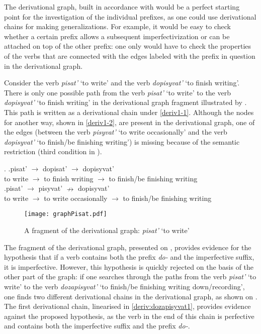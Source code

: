 The derivational graph, built in accordance with  would be a perfect starting point for the investigation of the individual prefixes, as one could use derivational chains for making generalizations. For example, it would be easy to check whether a certain prefix allows a subsequent imperfectivization or can be attached on top of the other prefix: one only would have to check the properties of the verbs that are connected with the edges labeled with the prefix in question in the derivational graph. 

Consider the verb \textit{pisat'} `to write' and the verb \textit{dopisyvat'} `to finish writing'. There is only one possible path from the verb \textit{pisat'} `to write' to the verb \textit{dopisyvat'} `to finish writing' in the derivational graph fragment illustrated by . This path is written as a derivational chain under \ref{deriv1-1}. Although the nodes for another way, shown in \ref{deriv1-2}, are present in the derivational graph, one of the edges (between the verb \textit{pisyvat'} `to write occasionally' and the verb \textit{dopisyvat'} `to finish/be finishing writing') is missing because of the semantic restriction (third condition in ).

\ex.\label{deriv1} \ag.\label{deriv1-1}pisat'\textsuperscript{\IPF} $\rightarrow$ dopisat'\textsuperscript{\PF} $\rightarrow$ dopisyvat'\textsuperscript{\IPF}\\
{to write} $\rightarrow$ {to finish writing} $\rightarrow$ {to finish/be finishing writing}\\
\bg.\label{deriv1-2}pisat'\textsuperscript{\IPF} $\rightarrow$ pisyvat'\textsuperscript{\IPF} $\nrightarrow$ dopisyvat'\\
{to write} $\rightarrow$ {to write occasionally} $\rightarrow$ {to finish/be finishing writing}\\

\begin{figure}
\texttt{[image: graphPisat.pdf]}
\caption{A fragment of the derivational graph: \textit{pisat'} `to write'\label{tree:dopisyvat}}
\end{figure}

The fragment of the derivational graph, presented on , provides evidence for the hypothesis that if a verb contains both the prefix \textit{do-} and the imperfective suffix, it is imperfective. However, this hypothesis is quickly rejected on the basis of the other part of the graph: if one searches through the paths from the verb \textit{pisat'} `to write' to the verb \textit{dozapisyvat'} `to finish/be finishing writing down/recording', one finds two different derivational chains in the derivational graph, as shown on . The first derivational chain, linearised in \ref{deriv:dozapisyvat1}, provides evidence against the proposed hypothesis, as the verb in the end of this chain is perfective and contains both the imperfective suffix and the prefix \textit{do-}. 

